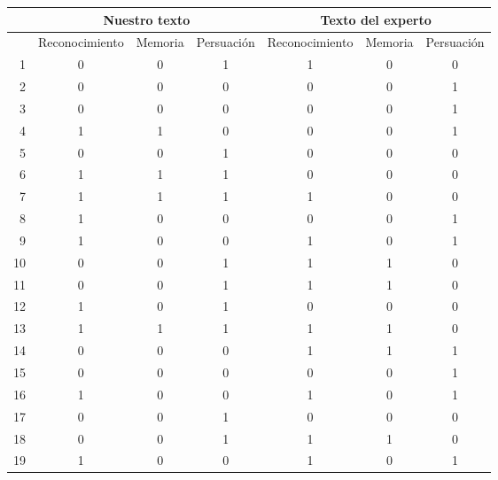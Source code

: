 \begin{table}
\centering
\tiny
\begin{tabular}{|r|c|c|c|c|c|c|}
   & \multicolumn{3}{c|}{Nuestro texto}     & \multicolumn{3}{c|}{Texto del experto}   \\\hline
   & Reconocimiento & Memoria & Persuación & Reconocimiento & Memoria & Persuación \\\hline \hline

1 &         0 &         0 &         1 &         1 &         0 &         0 \\
2 &         0 &         0 &         0 &         0 &         0 &         1 \\
3 &         0 &         0 &         0 &         0 &         0 &         1 \\
4 &         1 &         1 &         0 &         0 &         0 &         1 \\
5 &         0 &         0 &         1 &         0 &         0 &         0 \\
6 &         1 &         1 &         1 &         0 &         0 &         0 \\
7 &         1 &         1 &         1 &         1 &         0 &         0 \\
8 &         1 &         0 &         0 &         0 &         0 &         1 \\
9 &         1 &         0 &         0 &         1 &         0 &         1 \\
10 &         0 &         0 &         1 &         1 &         1 &         0 \\
11 &         0 &         0 &         1 &         1 &         1 &         0 \\
12 &         1 &         0 &         1 &         0 &         0 &         0 \\
13 &         1 &         1 &         1 &         1 &         1 &         0 \\
14 &         0 &         0 &         0 &         1 &         1 &         1 \\
15 &         0 &         0 &         0 &         0 &         0 &         1 \\
16 &         1 &         0 &         0 &         1 &         0 &         1 \\
17 &         0 &         0 &         1 &         0 &         0 &         0 \\
18 &         0 &         0 &         1 &         1 &         1 &         0 \\
19 &         1 &         0 &         0 &         1 &         0 &         1 \\

\end{tabular}
\end{table}
